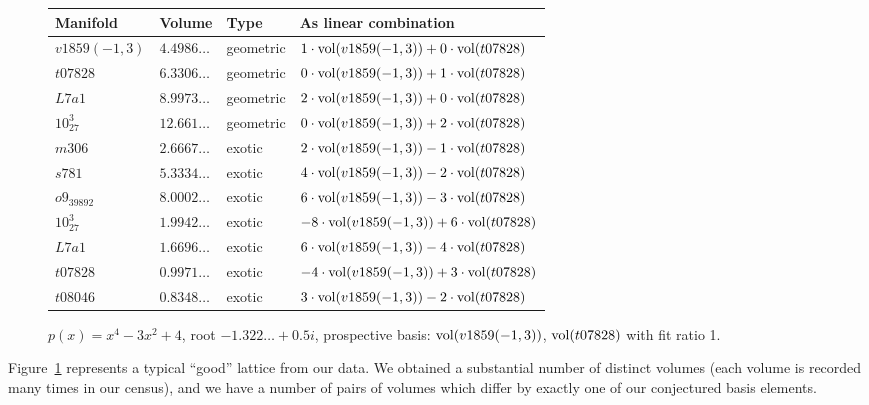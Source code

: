 \documentclass[10pt]{amsart}
\numberwithin{equation}{theorem}
\theoremstyle{definition}
\begin{document}
\begin{figure}[h]
  \begin{tabular}{llll} \hline
    Manifold & Volume & Type & As linear combination \\ \hline
    $v1859(-1,3)$ & $4.4986\dotsc$ & geometric & $1\cdot\operatorname{vol}(v1859(-1,3))+0\cdot\operatorname{vol}(t07828)$ \\
    $t07828$ & $6.3306\dotsc$ & geometric & $0\cdot\operatorname{vol}(v1859(-1,3))+1\cdot\operatorname{vol}(t07828)$ \\
    $L7a1$ & $8.9973\dotsc$ & geometric & $2\cdot\operatorname{vol}(v1859(-1,3))+0\cdot\operatorname{vol}(t07828)$ \\
    $10^{3}_{27}$ & $12.661\dotsc$ & geometric & $0\cdot\operatorname{vol}(v1859(-1,3))+2\cdot\operatorname{vol}(t07828)$ \\
    $m306$ & $2.6667\dotsc$ & exotic & $2\cdot\operatorname{vol}(v1859(-1,3))-1\cdot\operatorname{vol}(t07828)$ \\
    $s781$ & $5.3334\dotsc$ & exotic & $4\cdot\operatorname{vol}(v1859(-1,3))-2\cdot\operatorname{vol}(t07828)$ \\
    $o9_{39892}$ & $8.0002\dotsc$ & exotic & $6\cdot\operatorname{vol}(v1859(-1,3))-3\cdot\operatorname{vol}(t07828)$ \\
    $10^{3}_{27}$ & $1.9942\dotsc$ & exotic & $-8\cdot\operatorname{vol}(v1859(-1,3))+6\cdot\operatorname{vol}(t07828)$ \\
    $L7a1$ & $1.6696\dotsc$ & exotic & $6\cdot\operatorname{vol}(v1859(-1,3))-4\cdot\operatorname{vol}(t07828)$ \\
    $t07828$ & $0.9971\dotsc$ & exotic & $-4\cdot\operatorname{vol}(v1859(-1,3))+3\cdot\operatorname{vol}(t07828)$ \\
    $t08046$ & $0.8348\dotsc$ & exotic & $3\cdot\operatorname{vol}(v1859(-1,3))-2\cdot\operatorname{vol}(t07828)$ \\
  \end{tabular}
  \caption{$p(x) = x^4-3x^2+4$, root $-1.322\dotsc+0.5i$, prospective
  basis: $\operatorname{vol}(v1859(-1,3))$, $\operatorname{vol}(t07828)$ with fit ratio 1.}
  \label{fig:v1859-lattice}
\end{figure}

Figure~\ref{fig:v1859-lattice} represents a typical ``good'' lattice
from our data. We obtained a substantial number of distinct volumes
(each volume is recorded many times in our census), and we have a number
of pairs of volumes which differ by exactly one of our conjectured
basis elements.
\end{document}
